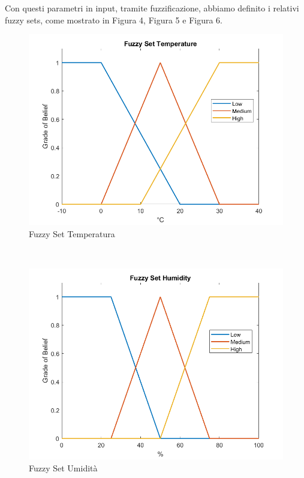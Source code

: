 \documentclass[conference,10pt]{IEEEtran}
\begin{document}
Con questi parametri in input, tramite fuzzificazione, abbiamo definito i relativi fuzzy sets, come mostrato in Figura 4, Figura 5 e Figura 6.
\begin{figure}[ht]
	\centering
	\includegraphics[width=1\linewidth]{images/temp_fs.png}
	\caption{Fuzzy Set Temperatura}
	\label{fig:MAD}
\end{figure}\\
\begin{figure}[ht]
	\centering
	\includegraphics[width=1\linewidth]{images/humi_fs.png}
	\caption{Fuzzy Set Umidità}
	\label{fig:MAD}
\end{figure}\\
\end{document}
